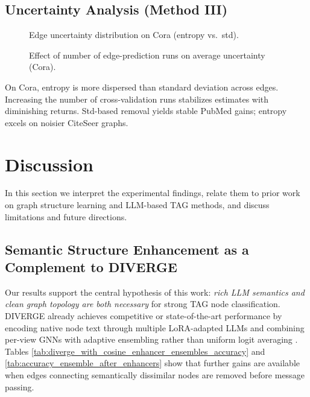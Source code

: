 \subsection{Uncertainty Analysis (Method III)}
\begin{figure}[htbp]
\centering
{}
\caption{Edge uncertainty distribution on Cora (entropy vs.\ std).}
\label{fig:edge_similarity_boxplots_cora}
\end{figure}

\begin{figure}[htbp]
\centering
{}
\hfill
{}
\caption{Effect of number of edge-prediction runs on average uncertainty (Cora).}
\label{fig:std_uncertainty_vs_K_cora}
\end{figure}

On Cora, entropy is more dispersed than standard deviation across edges. Increasing
the number of cross-validation runs stabilizes estimates with diminishing returns.
Std-based removal yields stable PubMed gains; entropy excels on noisier CiteSeer graphs.


\section{Discussion}
\label{sec:discussion}

In this section we interpret the experimental findings, relate them to prior work on
graph structure learning and LLM-based TAG methods, and discuss limitations and
future directions.


\subsection{Semantic Structure Enhancement as a Complement to DIVERGE}
\label{sec:disc-diverge-complement}

Our results support the central hypothesis of this work: \emph{rich LLM semantics and
clean graph topology are both necessary} for strong TAG node classification. DIVERGE
already achieves competitive or state-of-the-art performance by encoding native node
text through multiple LoRA-adapted LLMs and combining per-view GNNs with adaptive
ensembling rather than uniform logit averaging \citep{he2024harnessing}. Tables
\ref{tab:diverge_with_cosine_enhancer_ensembles_accuracy} and
\ref{tab:accuracy_ensemble_after_enhancers} show that further gains are available when
edges connecting semantically dissimilar nodes are removed before message passing.

